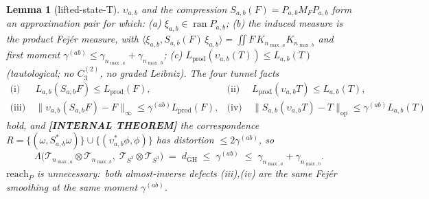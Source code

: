 \documentclass[11pt,a4paper]{article}
\theoremstyle{plain}
\newtheorem{lemma}[theorem]{Lemma}
\theoremstyle{definition}
\newcommand{\nmaxa}{n_{\max,a}}
\newcommand{\nmaxb}{n_{\max,b}}
\newcommand{\sthree}{S^{3}}
\newcommand{\Tcal}{\mathcal{T}}
\newcommand{\opnorm}[1]{\lVert #1 \rVert_{\mathrm{op}}}
\newcommand{\norm}[1]{\lVert #1 \rVert}
\newcommand{\Mat}{M}
\newcommand{\KS}{K}
\begin{document}
\begin{lemma}[lifted-state-T]\label{lem:lifted_state-T}
$\upsilon_{a,b}$ and the compression $S_{a,b}(F) = P_{a,b}\Mat_F P_{a,b}$
form an approximation pair for which:
\emph{(a)} $\xi_{a,b} \in \operatorname{ran} P_{a,b}$;
\emph{(b)} the induced measure is the product Fej\'er measure, with
$\langle \xi_{a,b}, S_{a,b}(F)\,\xi_{a,b}\rangle = \iint F\,\KS_{\nmaxa}
\KS_{\nmaxb}$ and first moment $\gamma^{(ab)} \le \gamma_{\nmaxa} +
\gamma_{\nmaxb}$;
\emph{(c)} $L_{\mathrm{prod}}(\upsilon_{a,b}(T)) \le L_{a,b}(T)$
(tautological; no $C_3^{(2)}$, no graded Leibniz).
The four tunnel facts
\begin{align*}
\text{(i)}\ & L_{a,b}(S_{a,b}F) \le L_{\mathrm{prod}}(F),
& \text{(ii)}\ & L_{\mathrm{prod}}(\upsilon_{a,b}T) \le L_{a,b}(T), \\
\text{(iii)}\ & \norm{\upsilon_{a,b}(S_{a,b}F) - F}_\infty
   \le \gamma^{(ab)} L_{\mathrm{prod}}(F),
& \text{(iv)}\ & \opnorm{S_{a,b}(\upsilon_{a,b}T) - T}
   \le \gamma^{(ab)} L_{a,b}(T)
\end{align*}
hold, and \textbf{[INTERNAL THEOREM]} the correspondence $R = \{(\omega, S_{a,b}^*\omega)\} \cup
\{(\upsilon_{a,b}^*\phi, \phi)\}$ has distortion $\le 2\gamma^{(ab)}$, so
\begin{equation}\label{eq:lifted_bound-T}
   \Lambda\bigl(\Tcal_{\nmaxa}\otimes\Tcal_{\nmaxb},\;
   \Tcal_{\sthree}\otimes\Tcal_{\sthree}\bigr)
   \;=\; d_{\mathrm{GH}} \;\le\; \gamma^{(ab)}
   \;\le\; \gamma_{\nmaxa} + \gamma_{\nmaxb}.
\end{equation}
$\mathrm{reach}_P$ is unnecessary:\ both almost-inverse defects (iii),(iv)
are the same Fej\'er smoothing at the same moment $\gamma^{(ab)}$.
\end{lemma}
\end{document}
